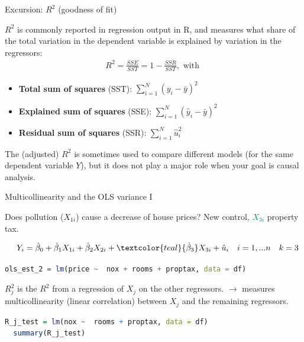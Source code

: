 \documentclass[11pt, aspectratio = 169]{beamer}
\begin{document}
\begin{frame}{Excursion: $R^2$ (goodness of fit)}

$R^2$ is commonly reported in regression output in R, and measures what share of the total variation in the dependent variable is explained by variation in the regressors:
\begin{align*}
 R^2=\frac{SSE}{SST}=1-\frac{SSR}{SST}, \text{ with }
 \end{align*}
\begin{itemize}
  \item \textbf{Total sum of squares} (SST): $\sum_{i=1}^N (y_i - \bar{y})^2$
  \item \textbf{Explained sum of squares} (SSE): $\sum_{i=1}^N (\hat{y}_i - \bar{y})^2$
  \item \textbf{Residual sum of squares} (SSR): $\sum_{i=1}^N \hat{u}_i^2$
\end{itemize}
\pause
The (adjusted) $R^2$ is sometimes used to compare different models (for the same dependent variable $Y$), but it does not play a major role when your goal is causal analysis.
\end{frame}

\begin{frame}[fragile]{Multicollinearity and the OLS variance I}

\begin{center}
  Does pollution ($X_{1i}$) cause a decrease of house prices? \pause New control, \textcolor{teal}{$X_{3i}$} property tax.
\end{center}
$$
\quad Y_i = \hat{\beta}_0 + \hat{\beta}_1 X_{1i} + \hat{\beta}_2 X_{2i} + \textcolor{teal}{\hat{\beta}_3} X_{3i} + \hat{u}_{i} \quad i = 1, ... n \quad k=3
$$
\vspace{-0.5cm}
\begin{lstlisting}[language=R]      
  ols_est_2 = lm(price ~  nox + rooms + proptax, data = df)
\end{lstlisting}
\pause
$R_j^2$ is the $R^2$ from a regression of $X_j$ on the other regressors. $\rightarrow$ measures multicollinearity (linear correlation) between $X_j$ and the remaining regressors. 
\begin{lstlisting}[language=R]      
  R_j_test = lm(nox ~  rooms + proptax, data = df)
  summary(R_j_test)
\end{lstlisting}
\end{frame}
\end{document}
